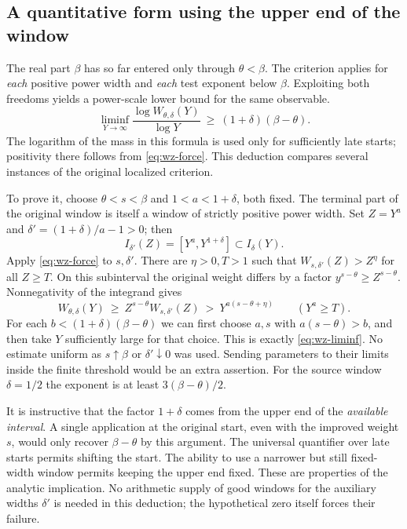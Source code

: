 \documentclass[12pt,letterpaper]{article}
\begin{document}
\subsection{A quantitative form using the upper end of the window}
The real part \(\beta\) has so far entered only through \(\theta<\beta\). The criterion applies for \emph{each} positive power width and \emph{each} test exponent below \(\beta\). Exploiting both freedoms yields a power-scale lower bound for the same observable.
\begin{equation}
 \liminf_{Y\to\infty}
       \frac{\log W_{\theta,\delta}(Y)}{\log Y}
                \ \ge\ (1+\delta)(\beta-\theta).                \label{eq:wz-liminf}
\end{equation}
The logarithm of the mass in this formula is used only for sufficiently late starts; positivity there follows from \eqref{eq:wz-force}. This deduction compares several instances of the original localized criterion.

To prove it, choose \(\theta<s<\beta\) and \(1<a<1+\delta\), both fixed. The terminal part of the original window is itself a window of strictly positive power width. Set \(Z=Y^a\) and \(\delta'=(1+\delta)/a-1>0\); then
\[
 I_{\delta'}(Z)=[Y^a,Y^{1+\delta}]\subset I_\delta(Y).
\]
Apply \eqref{eq:wz-force} to \(s,\delta'\). There are \(\eta>0,T>1\) such that \(W_{s,\delta'}(Z)>Z^\eta\) for all \(Z\ge T\). On this subinterval the original weight differs by a factor \(y^{s-\theta}\ge Z^{s-\theta}\). Nonnegativity of the integrand gives
\begin{equation}
 W_{\theta,\delta}(Y)
 \ \ge\ Z^{s-\theta}W_{s,\delta'}(Z)
 \ >\ Y^{a(s-\theta+\eta)} \qquad (Y^a\ge T).                  \label{eq:wz-bootstrap}
\end{equation}
For each \(b<(1+\delta)(\beta-\theta)\) we can first choose \(a,s\) with \(a(s-\theta)>b\), and then take \(Y\) sufficiently large for that choice. This is exactly \eqref{eq:wz-liminf}. No estimate uniform as \(s\uparrow\beta\) or \(\delta'\downarrow0\) was used. Sending parameters to their limits inside the finite threshold would be an extra assertion. For the source window \(\delta=1/2\) the exponent is at least \(3(\beta-\theta)/2\).

It is instructive that the factor \(1+\delta\) comes from the upper end of the \emph{available interval}. A single application at the original start, even with the improved weight \(s\), would only recover \(\beta-\theta\) by this argument. The universal quantifier over late starts permits shifting the start. The ability to use a narrower but still fixed-width window permits keeping the upper end fixed. These are properties of the analytic implication. No arithmetic supply of good windows for the auxiliary widths \(\delta'\) is needed in this deduction; the hypothetical zero itself forces their failure.
\end{document}

